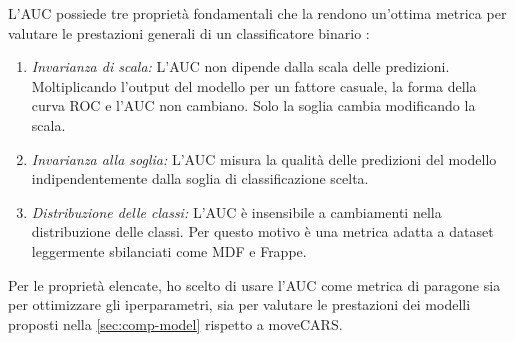 \documentclass[12pt,italian]{report}
\begin{document}
L'AUC possiede tre proprietà fondamentali che la rendono un'ottima metrica per valutare le prestazioni generali di un classificatore binario \cite{auc-invariance}:

\begin{enumerate}
\item \textit{Invarianza di scala:} L'AUC non dipende dalla scala delle predizioni. Moltiplicando l'output del modello per un fattore casuale, la forma della curva ROC e l'AUC non cambiano. Solo la soglia cambia modificando la scala.

\item \textit{Invarianza alla soglia:} L'AUC misura la qualità delle predizioni del modello indipendentemente dalla soglia di classificazione scelta.

\item \textit{Distribuzione delle classi:} L'AUC è insensibile a cambiamenti nella distribuzione delle classi. Per questo motivo è una metrica adatta a dataset leggermente sbilanciati come MDF e Frappe.
\end{enumerate}

\noindent Per le proprietà elencate, ho scelto di usare l'AUC come metrica di paragone sia per ottimizzare gli iperparametri, sia per valutare le prestazioni dei modelli proposti nella \autoref{sec:comp-model} rispetto a moveCARS.
\end{document}
